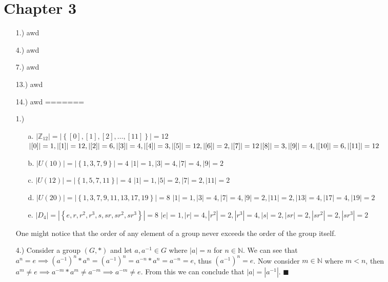 \documentclass[12pt]{article}
\newcommand{\vertb}[1]{\left\vert#1\right\vert}      %
\newcommand{\braces}[1]{\left\{#1\right\}}           %
\newcommand{\parens}[1]{\left(#1\right)}             %
\newcommand{\N}{\mathbb{N}}
\newcommand{\Z}{\mathbb{Z}}
\begin{document}
\section*{Chapter 3}
\begin{itemize}
<<<<<<< HEAD
    \item [1.)] awd

    \item [4.)] awd
    
    \item [7.)] awd

    \item [13.)] awd

    \item [14.)] awd
=======
    \item [1.)] \begin{itemize}
        \item [a.] $\vertb{\Z_{12}}=\vertb{\braces{[0],[1],[2],\dots,[11]}}=12$\newline
        $\vertb{[0]}=1,\vertb{[1]}=12,\vertb{[2]}=6,\vertb{[3]}=4,\vertb{[4]}=3,\vertb{[5]}=12,\vertb{[6]}=2,\vertb{[7]}=12\break\vertb{[8]}=3,\vertb{[9]}=4,\vertb{[10]}=6,\vertb{[11]}=12$

        \item [b.] $\vertb{U(10)}=\vertb{\braces{1,3,7,9}}=4$\newline
        $\vertb{1}=1,\vertb{3}=4,\vertb{7}=4,\vertb{9}=2$

        \item [c.] $\vertb{U(12)}=\vertb{\braces{1,5,7,11}}=4$\newline
        $\vertb{1}=1,\vertb{5}=2,\vertb{7}=2,\vertb{11}=2$

        \item [d.] $\vertb{U(20)}=\vertb{\braces{1,3,7,9,11,13,17,19}}=8$\newline
        $\vertb{1}=1,\vertb{3}=4,\vertb{7}=4,\vertb{9}=2,\vertb{11}=2,\vertb{13}=4,\vertb{17}=4,\vertb{19}=2$

        \item [e.] $\vertb{D_4}=\vertb{\braces{e,r,r^2,r^3,s,sr,sr^2,sr^3}}=8$\newline
        $\vertb{e}=1,\vertb{r}=4,\vertb{r^2}=2,\vertb{r^3}=4,\vertb{s}=2,\vertb{sr}=2,\vertb{sr^2}=2,\vertb{sr^3}=2$
    \end{itemize}
    One might notice that the order of any element of a group never exceeds the order of the group itself.

    \pagebreak
    \item [4.)] Consider a group $(G,*)$ and let $a,a^{-1}\in G$ where $\vertb{a}=n$ for $n\in\N$. We can see that $a^n=e\implies\parens{a^{-1}}^n*a^n=\parens{a^{-1}}^n=a^{-n}*a^n=a^{-n}=e$, thus $\parens{a^{-1}}^n=e$. Now consider $m\in\N$ where $m<n$, then $a^m\ne e\implies a^{-m}*a^m\ne a^{-m}\implies a^{-m}\ne e$. From this we can conclude that $\vertb{a}=\vertb{a^{-1}}$. $\blacksquare$


\end{itemize}
\end{document}
